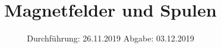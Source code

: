 

\subject{V308}
\title{Magnetfelder und Spulen}
\date{
  Durchführung: 26.11.2019
  \hspace{3em}
  Abgabe: 03.12.2019
}



\maketitle
\thispagestyle{empty}
\tableofcontents
\newpage







\printbibliography{}



